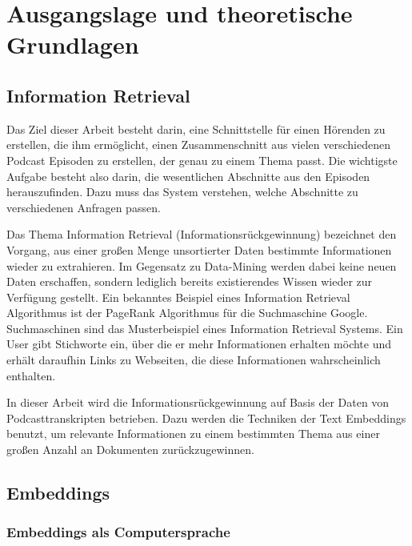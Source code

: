 
\chapter{Ausgangslage und theoretische Grundlagen}\label{ch:theoretical}

\section{Information Retrieval}

Das Ziel dieser Arbeit besteht darin, eine Schnittstelle für einen Hörenden zu erstellen, die ihm ermöglicht, einen Zusammenschnitt aus vielen verschiedenen Podcast Episoden zu erstellen, der genau zu einem Thema passt. 
Die wichtigste Aufgabe besteht also darin, die wesentlichen Abschnitte aus den Episoden herauszufinden. 
Dazu muss das System verstehen, welche Abschnitte zu verschiedenen Anfragen passen. 

Das Thema Information Retrieval (Informationsrückgewinnung) bezeichnet den Vorgang, aus einer großen Menge unsortierter Daten bestimmte Informationen wieder zu extrahieren.
Im Gegensatz zu Data-Mining werden dabei keine neuen Daten erschaffen, sondern lediglich bereits existierendes Wissen wieder zur Verfügung gestellt.
Ein bekanntes Beispiel eines Information Retrieval Algorithmus ist der PageRank Algorithmus für die Suchmaschine Google.
Suchmaschinen sind das Musterbeispiel eines Information Retrieval Systems.
Ein User gibt Stichworte ein, über die er mehr Informationen erhalten möchte und erhält daraufhin Links zu Webseiten, die diese Informationen wahrscheinlich enthalten.

In dieser Arbeit wird die Informationsrückgewinnung auf Basis der Daten von Podcasttranskripten betrieben.
Dazu werden die Techniken der Text Embeddings benutzt, um relevante Informationen zu einem bestimmten Thema aus einer großen Anzahl an Dokumenten zurückzugewinnen.



\section{Embeddings}

\subsection{Embeddings als Computersprache}

